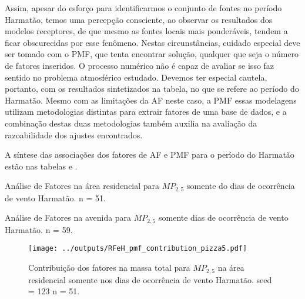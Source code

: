 Assim, apesar do esforço para identificarmos o conjunto de fontes no período 
Harmatão, temos uma percepção consciente, ao observar os resultados dos modelos 
receptores, de que mesmo as fontes locais mais ponderáveis, tendem a ficar 
obscurecidas por esse fenômeno. Nestas circunstâncias, cuidado especial deve 
ser tomado com o PMF, que tenta encontrar solução, qualquer que seja o número 
de fatores inseridos. O processo numérico não
é capaz de avaliar se isso faz sentido no problema atmosférico estudado. 
Devemos ter especial cautela, portanto, com os resultados sintetizados na 
tabela, no que se refere ao período do Harmatão. Mesmo com as limitações da 
AF neste caso, a PMF essas modelagens utilizam metodologias distintas para 
extrair fatores de uma base de dados, e a combinação destas duas 
metodologias também auxilia na avaliação da razoabilidade dos ajustes 
encontrados. 

A síntese das associações dos fatores de AF e PMF para o período do Harmatão 
estão nas tabelas \label{sintese_grosso_harmatao} e \label{sintese_fino_harmatao}.

\newpage
\begin{table}[H]
  \centering
  
  \caption{Análise de Fatores na área residencial para $MP_{2,5}$
           somente do dias de ocorrência de vento Harmatão. n = 51.
          \label{table:AF_RFeH5}}
\end{table}

\begin{table}[H]
  \centering
  
  \caption{Análise de Fatores na avenida para $MP_{2,5}$
           somente dias de ocorrência de vento Harmatão. n = 59.
          \label{table:AF_TFeH5}}
\end{table}

\begin{landscape}
  \begin{figure}
    \centering
    \begin{minipage}[b]{0.45\linewidth}
      \texttt{[image: ../outputs/RFeH\_pmf\_contribution\_pizza5.pdf]}
      \caption{Contribuição dos fatores na massa total para $MP_{2,5}$ na área
               residencial somente nos dias de ocorrência de vento Harmatão. seed = 123 n = 51.
               \label{fig:RFeH_contribution5}}
    \end{minipage}%
    \hspace{0.5cm}
    \begin{minipage}[b]{0.45\linewidth}
      
    \end{minipage}
  \end{figure}
\end{landscape}

